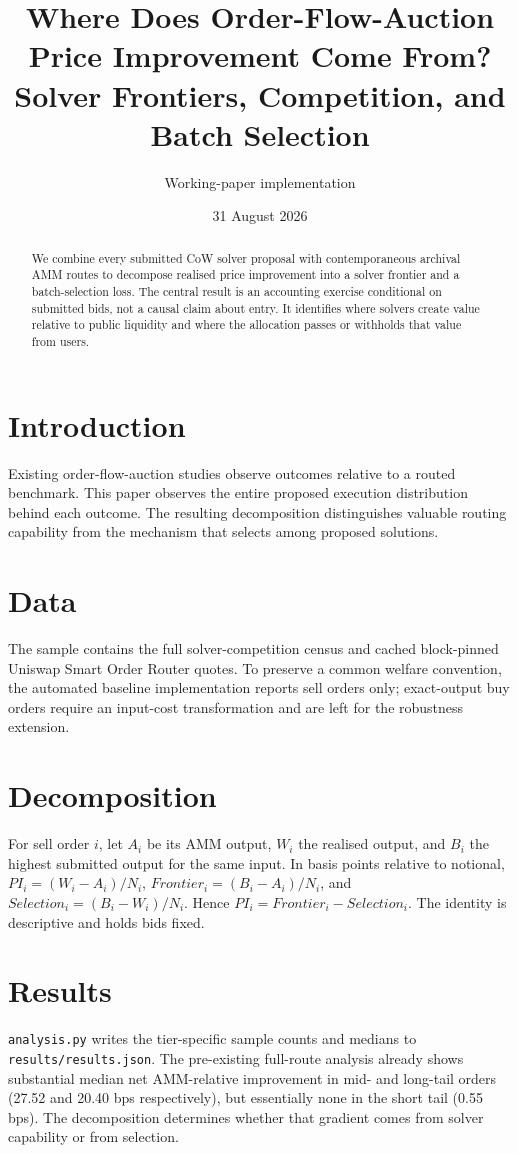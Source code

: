 \documentclass[11pt]{article}
\title{Where Does Order-Flow-Auction Price Improvement Come From?\\\large Solver Frontiers, Competition, and Batch Selection}
\author{Working-paper implementation}\date{31 August 2026}
\begin{document}
\maketitle
\begin{abstract} We combine every submitted CoW solver proposal with contemporaneous archival AMM routes to decompose realised price improvement into a solver frontier and a batch-selection loss.  The central result is an accounting exercise conditional on submitted bids, not a causal claim about entry.  It identifies where solvers create value relative to public liquidity and where the allocation passes or withholds that value from users.\end{abstract}
\section{Introduction} Existing order-flow-auction studies observe outcomes relative to a routed benchmark.  This paper observes the entire proposed execution distribution behind each outcome.  The resulting decomposition distinguishes valuable routing capability from the mechanism that selects among proposed solutions.
\section{Data} The sample contains the full solver-competition census and cached block-pinned Uniswap Smart Order Router quotes.  To preserve a common welfare convention, the automated baseline implementation reports sell orders only; exact-output buy orders require an input-cost transformation and are left for the robustness extension.
\section{Decomposition} For sell order $i$, let $A_i$ be its AMM output, $W_i$ the realised output, and $B_i$ the highest submitted output for the same input.  In basis points relative to notional, $PI_i=(W_i-A_i)/N_i$, $Frontier_i=(B_i-A_i)/N_i$, and $Selection_i=(B_i-W_i)/N_i$.  Hence $PI_i=Frontier_i-Selection_i$.  The identity is descriptive and holds bids fixed.
\section{Results} \texttt{analysis.py} writes the tier-specific sample counts and medians to \texttt{results/results.json}.  The pre-existing full-route analysis already shows substantial median net AMM-relative improvement in mid- and long-tail orders (27.52 and 20.40 bps respectively), but essentially none in the short tail (0.55 bps).  The decomposition determines whether that gradient comes from solver capability or from selection.
\end{document}
